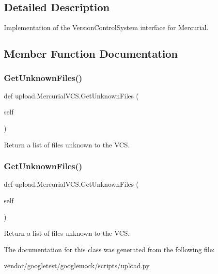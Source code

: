 \subsection{Detailed Description}
\begin{DoxyVerb}Implementation of the VersionControlSystem interface for Mercurial.\end{DoxyVerb}
 

\subsection{Member Function Documentation}
\mbox{\label{classupload_1_1_mercurial_v_c_s_a6190899fb86cd09ad84cc5d4b0ebd2f3}} 
\subsubsection{\texorpdfstring{Get\+Unknown\+Files()}{GetUnknownFiles()}\hspace{0.1cm}{\footnotesize\ttfamily [1/2]}}
{\footnotesize\ttfamily def upload.\+Mercurial\+V\+C\+S.\+Get\+Unknown\+Files (\begin{DoxyParamCaption}\item[{}]{self }\end{DoxyParamCaption})}

\begin{DoxyVerb}Return a list of files unknown to the VCS.\end{DoxyVerb}
 \mbox{\label{classupload_1_1_mercurial_v_c_s_a6190899fb86cd09ad84cc5d4b0ebd2f3}} 
\subsubsection{\texorpdfstring{Get\+Unknown\+Files()}{GetUnknownFiles()}\hspace{0.1cm}{\footnotesize\ttfamily [2/2]}}
{\footnotesize\ttfamily def upload.\+Mercurial\+V\+C\+S.\+Get\+Unknown\+Files (\begin{DoxyParamCaption}\item[{}]{self }\end{DoxyParamCaption})}

\begin{DoxyVerb}Return a list of files unknown to the VCS.\end{DoxyVerb}
 

The documentation for this class was generated from the following file\+:\begin{DoxyCompactItemize}
\item 
vendor/googletest/googlemock/scripts/upload.\+py\end{DoxyCompactItemize}
